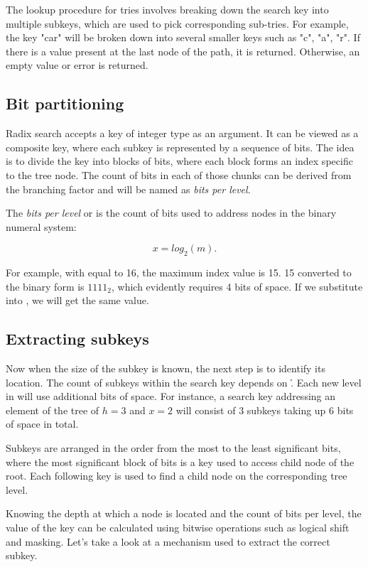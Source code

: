 The lookup procedure for tries involves breaking down the search key into multiple subkeys, which are used to pick corresponding sub-tries. For example, the key "car" will be broken down into several smaller keys such as "c", "a", "r". If there is a value present at the last node of the path, it is returned. Otherwise, an empty value or error is returned.

\subsection*{Bit partitioning}
Radix search accepts a key of integer type as an argument. It can be viewed as a composite key, where each subkey is represented by a sequence of bits. The idea is to divide the key into blocks of bits, where each block forms an index specific to the tree node. The count of bits in each of those chunks can be derived from the branching factor and will be named as \emph{bits per level}.

The \emph{bits per level} or \x{} is the count of bits used to address \m{} nodes in the binary numeral system:

\begin{equation}
    \label{eq:bits-per-level}
    x = log_2(m).
\end{equation}

For example, with \m{} equal to 16, the maximum index value is 15. 15 converted to the binary form is $1111_2$, which evidently requires 4 bits of space. If we substitute \m{} into , we will get the same value.

\subsection*{Extracting subkeys}

Now when the size of the subkey is known, the next step is to identify its location. The count of subkeys within the search key depends on \h. Each new level in \rbtree{} will use \x{} additional bits of space. For instance, a search key addressing an element of the tree of ${h = 3}$ and ${x = 2}$ will consist of 3 subkeys taking up 6 bits of space in total.

Subkeys are arranged in the order from the most to the least significant bits, where the most significant block of bits is a key used to access child node of the root. Each following key is used to find a child node on the corresponding tree level.

Knowing the depth at which a node is located and the count of bits per level, the value of the key can be calculated using bitwise operations such as logical shift and masking. Let's take a look at a mechanism used to extract the correct subkey.

